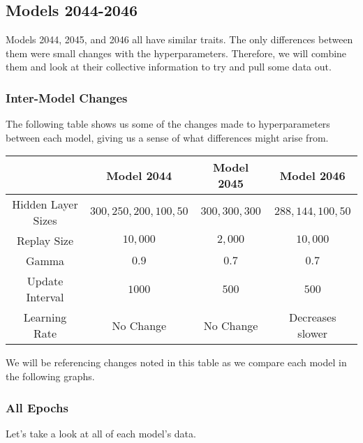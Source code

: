 \documentclass[12pt]{article}
\begin{document}
\newpage

\subsection{Models 2044-2046}

Models 2044, 2045, and 2046 all have similar traits. The only differences between them were small changes with the hyperparameters. Therefore, we will combine them and look at their collective information to try and pull some data out.

\subsubsection{Inter-Model Changes}

The following table shows us some of the changes made to hyperparameters between each model, giving us a sense of what differences might arise from.


\begin{center}
	\begin{tabular}{| c | c | c | c |}
		\hline
		                   & Model 2044           & Model 2045    & Model 2046          \\
		\hline
		\hline
		Hidden Layer Sizes & $300,250,200,100,50$ & $300,300,300$ & $288, 144, 100, 50$ \\
		\hline
		Replay Size        & $10,000$             & $2,000$       & $10,000$            \\
		\hline
		Gamma              & $0.9$                & $0.7$         & $0.7$               \\
		\hline
		Update Interval    & $1000$               & $500$         & $500$               \\
		\hline
		Learning Rate      & No Change            & No Change     & Decreases slower    \\
		\hline
	\end{tabular}

\end{center}

We will be referencing changes noted in this table as we compare each model in the following graphs.


\newpage

\subsubsection{All Epochs}

Let's take a look at all of each model's data.
\end{document}
